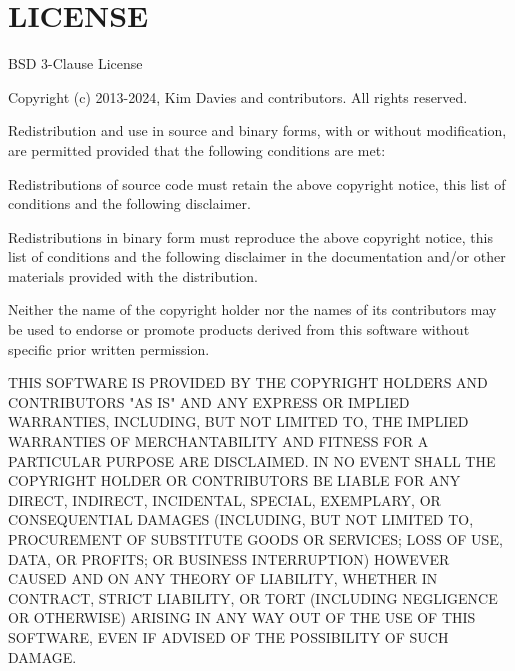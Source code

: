 \chapter{LICENSE}
\hypertarget{md__c_1_2_users_2kmarty_2_documents_2_labo3__architecture__killian__marty_2_lib_2site-packages_25e94905e4cd759293148577be0c07064}{}\label{md__c_1_2_users_2kmarty_2_documents_2_labo3__architecture__killian__marty_2_lib_2site-packages_25e94905e4cd759293148577be0c07064}
BSD 3-\/Clause License

Copyright (c) 2013-\/2024, Kim Davies and contributors. All rights reserved.

Redistribution and use in source and binary forms, with or without modification, are permitted provided that the following conditions are met\+:


\begin{DoxyEnumerate}
\item Redistributions of source code must retain the above copyright notice, this list of conditions and the following disclaimer.
\item Redistributions in binary form must reproduce the above copyright notice, this list of conditions and the following disclaimer in the documentation and/or other materials provided with the distribution.
\item Neither the name of the copyright holder nor the names of its contributors may be used to endorse or promote products derived from this software without specific prior written permission.
\end{DoxyEnumerate}

THIS SOFTWARE IS PROVIDED BY THE COPYRIGHT HOLDERS AND CONTRIBUTORS "{}\+AS IS"{} AND ANY EXPRESS OR IMPLIED WARRANTIES, INCLUDING, BUT NOT LIMITED TO, THE IMPLIED WARRANTIES OF MERCHANTABILITY AND FITNESS FOR A PARTICULAR PURPOSE ARE DISCLAIMED. IN NO EVENT SHALL THE COPYRIGHT HOLDER OR CONTRIBUTORS BE LIABLE FOR ANY DIRECT, INDIRECT, INCIDENTAL, SPECIAL, EXEMPLARY, OR CONSEQUENTIAL DAMAGES (INCLUDING, BUT NOT LIMITED TO, PROCUREMENT OF SUBSTITUTE GOODS OR SERVICES; LOSS OF USE, DATA, OR PROFITS; OR BUSINESS INTERRUPTION) HOWEVER CAUSED AND ON ANY THEORY OF LIABILITY, WHETHER IN CONTRACT, STRICT LIABILITY, OR TORT (INCLUDING NEGLIGENCE OR OTHERWISE) ARISING IN ANY WAY OUT OF THE USE OF THIS SOFTWARE, EVEN IF ADVISED OF THE POSSIBILITY OF SUCH DAMAGE. 